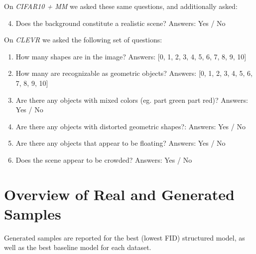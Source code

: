 \documentclass{article}
\begin{document}
On \emph{CIFAR10 + MM} we asked these same questions, and additionally asked:
\begin{enumerate}
\setcounter{enumi}{3}
\item Does the background constitute a realistic scene? Answers: Yes / No
\end{enumerate}

On \emph{CLEVR} we asked the following set of questions:
\begin{enumerate}
\item How many shapes are in the image? Answers: [0, 1, 2, 3, 4, 5, 6, 7, 8, 9, 10]
\item How many are recognizable as geometric objects? Answers: [0, 1, 2, 3, 4, 5, 6, 7, 8, 9, 10]
\item Are there any objects with mixed colors (eg. part green part red)? Answers: Yes / No
\item Are there any objects with distorted geometric shapes?: Answers: Yes / No 
\item Are there any objects that appear to be floating? Answers: Yes / No
\item Does the scene appear to be crowded? Answers: Yes / No
\end{enumerate}

\newpage
\section{Overview of Real and Generated Samples}
\label{app:samples}
Generated samples are reported for the best (lowest FID) structured model, as well as the best baseline model for each dataset.
\end{document}
